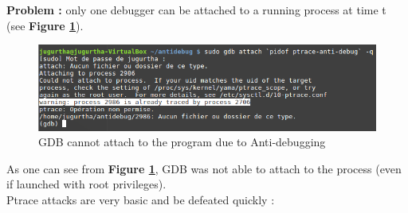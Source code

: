 \textbf{\color{red}Problem : } only one debugger can be attached to a running process at time t (see \textbf{Figure \ref{GDB cannot attach to the program due to Anti-debugging}}).
    		\begin{figure}[H]
					\centering
        			\includegraphics[scale=0.5]{img/solution/gdb-cannot-be-attached.png}
        			\caption{GDB cannot attach to the program due to Anti-debugging}
        			\label{GDB cannot attach to the program due to Anti-debugging}
   			 \end{figure}
   			 As one can see from \textbf{Figure \ref{GDB cannot attach to the program due to Anti-debugging}}, GDB was not able to attach to the process (even if launched with root privileges).\\
   			 
Ptrace attacks are very basic and be defeated quickly :




